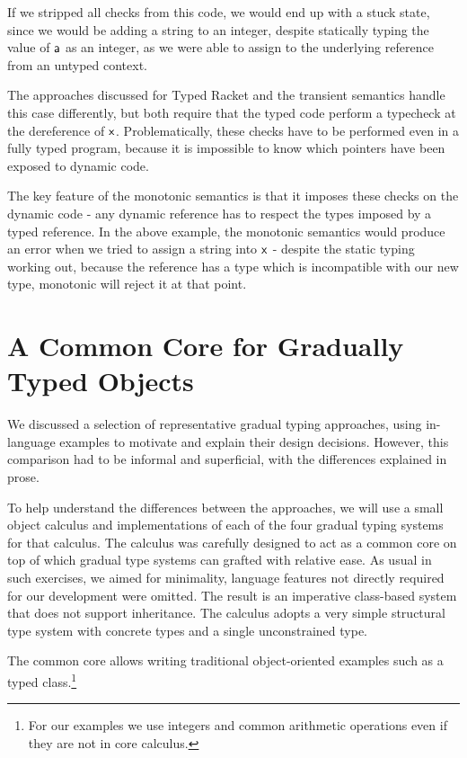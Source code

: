 \documentclass[preprint]{sigplanconf}
\newcommand{\x}{\M{\xt{x}}}
\renewcommand{\a}{\M{\xt a}}
\newcommand{\M}[1]{\ensuremath{#1}\xspace}
\newcommand{\xt}[1]{{\sf{#1}}\xspace}
\begin{document}
If we stripped all checks from this code, we would end up with a stuck
state, since we would be adding a string to an integer, despite statically
typing the value of $\a$ as an integer, as we were able to assign to the
underlying reference from an untyped context.

The approaches discussed for Typed Racket and the transient semantics
handle this case differently, but both require that the typed code perform
a typecheck at the dereference of $\x$. Problematically, these checks
have to be performed even in a fully typed program, because it is impossible
to know which pointers have been exposed to dynamic code.

The key feature of the monotonic semantics is that it imposes these checks 
on the dynamic code - any dynamic reference has to respect the types imposed
by a typed reference. In the above example, the monotonic semantics would
produce an error when we tried to assign a string into $\x$ - despite the 
static typing working out, because the reference has a type which is incompatible
with our new type, monotonic will reject it at that point.
\section{A Common Core for Gradually Typed Objects}

We discussed a selection of representative gradual typing approaches, using
in-language examples to motivate and explain their design decisions. However,
this comparison had to be informal and superficial, with the differences 
explained in prose. 

To help understand the differences between the approaches, we will use a 
small object calculus and implementations of each of the four gradual 
typing systems for that calculus. The calculus was
carefully designed to act as a common core on top of which gradual type
systems can grafted with relative ease. As usual in such exercises, we aimed
for minimality, language features not directly required for our development
were omitted. The result is an imperative class-based system that does not
support inheritance. The calculus adopts a very simple structural type
system with concrete types and a single unconstrained type.

The common core allows writing traditional object-oriented examples such as
a typed \xt{Point} class.\footnote{For our examples we use integers and
  common arithmetic operations even if they are not in core calculus.}
\end{document}

